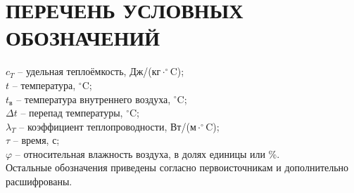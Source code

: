 \newpage
\chapter*{ПЕРЕЧЕНЬ УСЛОВНЫХ ОБОЗНАЧЕНИЙ}

\noindent %
$c_{T}$ -- удельная теплоёмкость, Дж/(кг$\cdot^\circ$C);\\
$t$ -- температура, $^\circ$C;\\
$t_\text{в}$ -- температура внутреннего воздуха, $^\circ$C;\\
$\Delta t$ -- перепад температуры, $^\circ$C;\\
$\lambda_{T}$  -- коэффициент теплопроводности, Вт/(м$\cdot^\circ$C);\\
$\tau$ -- время, с;\\
$\varphi$ -- относительная влажность воздуха, в долях единицы или \%.\\



Остальные обозначения приведены согласно первоисточникам и дополнительно расшифрованы.

